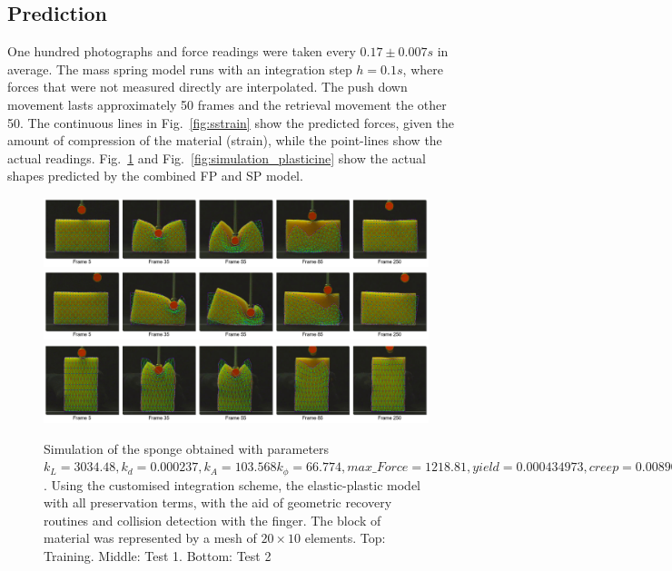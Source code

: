 \documentclass[journal]{IEEEtran}
\newcommand{\fref}[1]{Fig.~\ref{#1}}
\newcommand{\comment}[1]{{\color{red} #1}}
\begin{document}
\subsection{Prediction}

One hundred photographs and force readings were taken every $0.17\pm0.007 s$ in average.  The mass spring model runs with an integration step \comment{$h=0.1s$}, where forces that were not measured directly are interpolated.  The push down movement lasts approximately 50 frames and the retrieval movement the other 50.  The continuous lines in \fref{fig:sstrain} show the predicted forces, given the amount of compression of the material (strain), while the point-lines show the actual readings.  \fref{fig:simulation_sponge} and \fref{fig:simulation_plasticine} show the actual shapes predicted \comment{by the combined FP and SP model}.

\begin{figure}[!t]
\centering
\includegraphics[width=178mm]{arrio9}
\includegraphics[width=178mm]{arrio10}
\includegraphics[width=178mm]{arrio11}
\caption{Simulation of the sponge obtained with parameters $k_L=3034.48, k_d=0.000237, k_A=103.568 k_{\phi}=66.774, max\_Force=1218.81, yield=0.000434973, creep=0.00890343, max\_\alpha=0.45204$.  Using the customised integration scheme, the elastic-plastic model with all preservation terms, with the aid of geometric recovery routines and collision detection with the finger.  The block of material was represented by a mesh of $20 \times 10$ elements. Top: Training. Middle: Test 1. Bottom: Test 2}\label{fig:simulation_sponge}
\end{figure}
\end{document}
